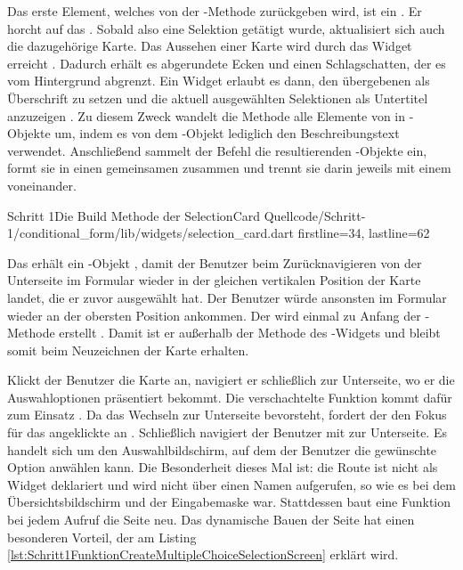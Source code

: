 Das erste Element, welches von der -Methode zurückgeben wird, ist ein  .
Er horcht auf das  .
Sobald also eine Selektion getätigt wurde, aktualisiert sich auch die dazugehörige Karte.
Das Aussehen einer Karte wird durch das Widget  erreicht .
Dadurch erhält es abgerundete Ecken und einen Schlagschatten, der es vom Hintergrund abgrenzt.
Ein  Widget erlaubt es dann, den übergebenen  als Überschrift zu setzen  und die aktuell ausgewählten Selektionen als Untertitel anzuzeigen .
Zu diesem Zweck wandelt die Methode  alle Elemente von  in -Objekte um, indem es von dem -Objekt lediglich den Beschreibungstext  verwendet.
Anschließend sammelt der Befehl  die resultierenden -Objekte ein, formt sie in einen gemeinsamen  zusammen und trennt sie darin jeweils mit einem  voneinander.

\begin{alexlisting}{Schritt 1}{Die Build Methode der SelectionCard}
  {Quellcode/Schritt-1/conditional_form/lib/widgets/selection_card.dart}
  {firstline=34, lastline=62}
  \label{lst:Schritt1BuildMethodeDerSelectionCard}
\end{alexlisting}

Das  erhält ein -Objekt , damit der Benutzer beim Zurücknavigieren von der Unterseite im Formular wieder in der gleichen vertikalen Position der Karte landet, die er zuvor ausgewählt hat.
Der Benutzer würde ansonsten im Formular wieder an der obersten Position ankommen.
Der  wird einmal zu Anfang der -Methode erstellt .
Damit ist er außerhalb der Methode  des -Widgets und bleibt somit beim Neuzeichnen der Karte erhalten.

\ifIncludeFigures \clearpage \fi
Klickt der Benutzer die Karte an, navigiert er schließlich zur Unterseite, wo er die Auswahloptionen präsentiert bekommt.
Die verschachtelte Funktion  kommt dafür zum Einsatz .
Da das Wechseln zur Unterseite bevorsteht, fordert der  den Fokus für das angeklickte  an .
Schließlich navigiert der Benutzer mit  zur Unterseite. Es handelt sich um den Auswahlbildschirm, auf dem der Benutzer die gewünschte Option anwählen kann. Die Besonderheit dieses Mal ist: die Route ist nicht als Widget deklariert und wird nicht über einen Namen aufgerufen, so wie es bei dem Übersichtsbildschirm und der Eingabemaske war. Stattdessen baut eine Funktion bei jedem Aufruf die Seite neu. Das dynamische Bauen der Seite hat einen besonderen Vorteil, der am Listing \ref{lst:Schritt1FunktionCreateMultipleChoiceSelectionScreen} erklärt wird.







